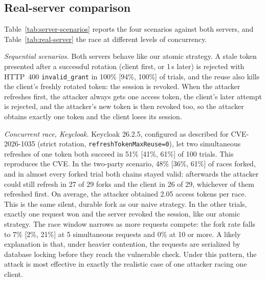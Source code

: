 \documentclass[conference]{IEEEtran}
\begin{document}
\subsection{Real-server comparison}

Table~\ref{tab:server-scenarios} reports the four scenarios against both
servers, and Table~\ref{tab:real-server} the race at different levels of
concurrency.





\emph{Sequential scenarios.} Both servers behave like our atomic
strategy. A stale token presented after a successful rotation (client
first, or 1\,s later) is rejected with HTTP~400 \texttt{invalid\_grant}
in 100\% [94\%, 100\%] of trials, and the reuse also kills the client's
freshly rotated token: the session is revoked. When the attacker
refreshes first, the attacker always gets one access token, the client's
later attempt is rejected, and the attacker's new token is then revoked
too, so the attacker obtains exactly one token and the client loses its
session.

\emph{Concurrent race, Keycloak.} Keycloak 26.2.5, configured as
described for CVE-2026-1035 (strict rotation,
\texttt{refreshTokenMaxReuse=0}), let two simultaneous refreshes of one
token both succeed in 51\% [41\%, 61\%] of 100 trials. This reproduces
the CVE. In the two-party scenario, 48\% [36\%, 61\%] of races forked,
and in almost every forked trial both chains stayed valid: afterwards the
attacker could still refresh in 27 of 29 forks and the client in 26 of
29, whichever of them refreshed first. On average, the attacker obtained 2.05
access tokens per race. This is the same silent, durable fork as our
naive strategy. In the other trials,
exactly one request won and the server revoked the session, like our
atomic strategy. The race window narrows as more requests compete: the
fork rate falls to 7\% [2\%, 21\%] at 5 simultaneous requests and 0\% at
10 or more. A likely explanation is that, under heavier contention, the
requests are serialized by database locking before they reach the
vulnerable check. Under this pattern, the attack is most effective in
exactly the realistic case of one attacker racing one client.
\end{document}

